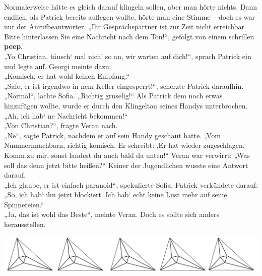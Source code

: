 \documentclass[oneside]{memoir}
\newcommand{\parasep}{
\bigskip
\bigskip
\begin{center} 
   \includegraphics[scale=.08]{parasep5.jpg} 
\end{center}
\bigskip
\bigskip
}
\begin{document}
Normalerweise hätte es gleich darauf klingeln sollen, aber man hörte nichts. Dann endlich, als Patrick bereits auflegen wollte, hörte man eine Stimme -- doch es war nur der 
Anrufbeantworter. „Ihr Gesprächspartner ist zur Zeit nicht erreichbar. Bitte hinterlassen Sie eine Nachricht nach dem Ton!“, gefolgt von einem schrillen \textbf{peep}. \\
„Yo Christian, täusch‘ mal nich' so an, wir warten auf dich!“, sprach Patrick ein und legte auf.
Georgi meinte dazu:  \\ „Komisch, er hat wohl keinen Empfang.“ \\
„Safe, er ist irgendwo in nem Keller eingesperrt!“, scherzte Patrick daraufhin. \\
„Normal“, lachte Sofia. „Richtig gruselig!“
Als Patrick dem noch etwas hinzufügen wollte, wurde er durch den Klingelton seines Handys unterbrochen. \\ „Ah, ich hab‘ ne Nachricht bekommen!“ \\
„Von Christian?“, fragte Veran nach. \\
„Ne“, sagte Patrick, nachdem er auf sein Handy geschaut hatte. „Vom Nummernnachbarn, richtig komisch. Er schreibt: ‚Er hat wieder zugeschlagen. Komm zu mir, sonst landest du auch bald da unten!\grq“
Veran war verwirrt: „Was soll das denn jetzt bitte heißen?“
Keiner der Jugendlichen wusste eine Antwort darauf. \\
„Ich glaube, er ist einfach paranoid“, spekulierte Sofia.
Patrick verkündete darauf: „So, ich hab‘ ihn jetzt blockiert. Ich hab‘ echt keine Lust mehr auf seine Spinnereien.“ \\
„Ja, das ist wohl das Beste“, meinte Veran. Doch es sollte sich anders herausstellen.
     
\parasep
\end{document}
